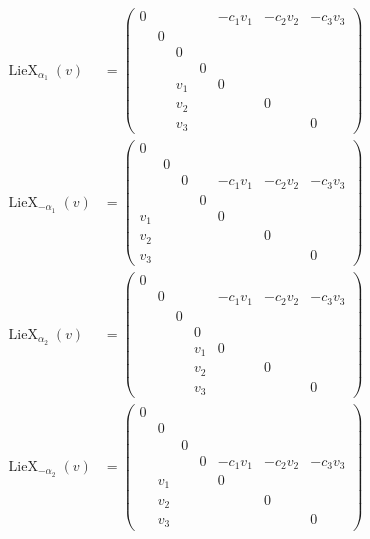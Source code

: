\documentclass[12pt]{article}
\theoremstyle{definition}
\numberwithin{theorem}{subsection}
\DeclareMathOperator{\LieX}{LieX}
\begin{document}
\begin{align*}
	\LieX_{\alpha_1}(v) &=
	\begin{pmatrix}
		0 &&&& -c_1 v_1 & -c_2 v_2 & -c_3 v_3 \\
		& 0 \\
		&& 0 \\
		&&& 0 \\
		&& v_1 && 0 \\
		&& v_2 &&& 0 \\
		&& v_3 &&&& 0
	\end{pmatrix} \\
	\LieX_{-\alpha_1}(v) &=
	\begin{pmatrix}
		0 \\
		& 0 \\
		&& 0 && -c_1 v_1 & -c_2 v_2 & -c_3 v_3 \\
		&&& 0 \\
		v_1 && && 0 \\
		v_2 &&  &&& 0 \\
		v_3 && &&&& 0
	\end{pmatrix} \\
	\LieX_{\alpha_2}(v) &=
	\begin{pmatrix}
		0 \\
		& 0 & && -c_1 v_1 & -c_2 v_2 & -c_3 v_3\\
		&& 0  \\
		&&& 0 \\
		&&& v_1& 0 \\
		&&  & v_2 && 0 \\
		&& & v_3 &&& 0
	\end{pmatrix} \\
	\LieX_{-\alpha_2}(v) &=
	\begin{pmatrix}
		0 \\
		& 0 \\
		&& 0  \\
		&&& 0 & -c_1 v_1 & -c_2 v_2 & -c_3 v_3 \\
		& v_1 &&& 0 \\
		& v_2 &&&& 0 \\
		& v_3 &&&&& 0
	\end{pmatrix} \\
\end{align*}
%
%
%
\end{document}
